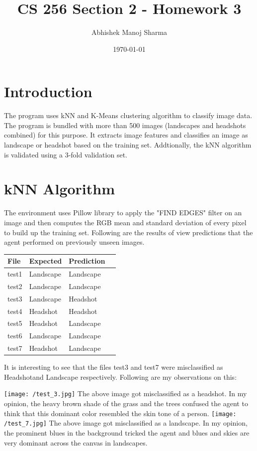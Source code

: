 \documentclass{article}
\title{CS 256 Section 2 - Homework 3}
\author{Abhishek Manoj Sharma}
\date{\today}
\begin{document}
\maketitle

\section{Introduction}

The program uses kNN and K-Means clustering algorithm to classify image data. The program is bundled with more than 500 images (landscapes and headshots combined) for this purpose. It extracts image features and classifies an image as landscape or headshot based on the training set. Addtionally, the kNN algorithm is validated using a 3-fold validation set.


\section{kNN Algorithm}
The environment uses Pillow library to apply the "FIND EDGES" filter on an image and then computes the RGB mean and standard deviation of every pixel to build up the training set. Following are the results of view predictions that the agent performed on previously unseen images.
\newline
\newline
\begin{tabular}{ | l | l | l | p{5cm} |}
\hline
File & Expected & Prediction\\ \hline
test1 & Landscape & Landscape \\ \hline
test2 & Landscape & Landscape  \\ \hline
test3 & Landscape & Headshot\\ \hline
test4 & Headshot & Headshot \\ \hline
test5 & Headshot & Landscape\\ \hline
test6 & Landscape & Landscape\\ \hline
test7 & Headshot & Landscape \\ 
\hline
\end{tabular}
\newline
\newline
It is interesting to see that the files test3 and test7 were misclassified as Headshotand Landscape respectively. Following are my observations on this:

\begin{center}
\texttt{[image: /test\_3.jpg]}
\newline
The above image got misclassified as a headshot. In my opinion, the heavy brown shade of the grass and the trees confused the agent to think that this dominant color resembled the skin tone of a person.
\newline
\newline
\texttt{[image: /test\_7.jpg]}
\newline
The above image got misclassified as a landscape. In my opinion, the prominent blues in the background tricked the agent and blues and skies are very dominant across the canvas in landscapes.
\end{center}
\newline
\newline
\newline
\end{document}

